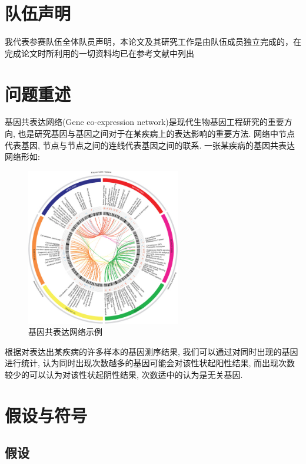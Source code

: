 \documentclass[zihao=-4]{ctexart}
\begin{document}
\newpage

\section*{队伍声明}

我代表参赛队伍全体队员声明，本论文及其研究工作是由队伍成员独立完成的，在完成论文时所利用的一切资料均已在参考文献中列出 
\newpage
\tableofcontents

\section{问题重述}
基因共表达网络(Gene co-expression network)是现代生物基因工程研究的重要方向, 也是研究基因与基因之间对于在某疾病上的表达影响的重要方法. 网络中节点代表基因, 节点与节点之间的连线代表基因之间的联系. 一张某疾病的基因共表达网络形如:
\begin{figure}[H]
    \centering
    \includegraphics[width=0.6\textwidth]{pic/example.jpg}
    \caption{基因共表达网络示例\cite{example}}
\end{figure}

根据对表达出某疾病的许多样本的基因测序结果, 我们可以通过对同时出现的基因进行统计, 认为同时出现次数越多的基因可能会对该性状起阳性结果, 而出现次数较少的可以认为对该性状起阴性结果, 次数适中的认为是无关基因.
\section{假设与符号}
\subsection{假设}
\end{document}
